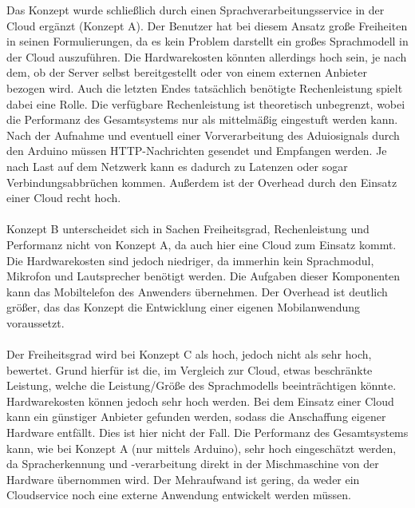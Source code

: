 Das Konzept wurde schließlich durch einen Sprachverarbeitungsservice in der Cloud ergänzt (Konzept A).
Der Benutzer hat bei diesem Ansatz große Freiheiten in seinen Formulierungen, da es kein Problem darstellt ein großes Sprachmodell in der Cloud auszuführen.
Die Hardwarekosten könnten allerdings hoch sein, je nach dem, ob der Server selbst bereitgestellt oder von einem externen Anbieter bezogen wird.
Auch die letzten Endes tatsächlich benötigte Rechenleistung spielt dabei eine Rolle.
Die verfügbare Rechenleistung ist theoretisch unbegrenzt, wobei die Performanz des Gesamtsystems nur als mittelmäßig eingestuft werden kann.
Nach der Aufnahme und eventuell einer Vorverarbeitung des Aduiosignals durch den Arduino müssen \ac{HTTP}-Nachrichten gesendet und Empfangen werden.
Je nach Last auf dem Netzwerk kann es dadurch zu Latenzen oder sogar Verbindungsabbrüchen kommen.
Außerdem ist der Overhead durch den Einsatz einer Cloud recht hoch.\\\\
Konzept B unterscheidet sich in Sachen Freiheitsgrad, Rechenleistung und Performanz nicht von Konzept A, da auch hier eine Cloud zum Einsatz kommt.
Die Hardwarekosten sind jedoch niedriger, da immerhin kein Sprachmodul, Mikrofon und Lautsprecher benötigt werden.
Die Aufgaben dieser Komponenten kann das Mobiltelefon des Anwenders übernehmen.
Der Overhead ist deutlich größer, das das Konzept die Entwicklung einer eigenen Mobilanwendung voraussetzt.\\\\
Der Freiheitsgrad wird bei Konzept C als hoch, jedoch nicht als sehr hoch, bewertet.
Grund hierfür ist die, im Vergleich zur Cloud, etwas beschränkte Leistung, welche die Leistung/Größe des Sprachmodells beeinträchtigen könnte.
Hardwarekosten können jedoch sehr hoch werden.
Bei dem Einsatz einer Cloud kann ein günstiger Anbieter gefunden werden, sodass die Anschaffung eigener Hardware entfällt.
Dies ist hier nicht der Fall. 
Die Performanz des Gesamtsystems kann, wie bei Konzept A (nur mittels Arduino), sehr hoch eingeschätzt werden, da Spracherkennung und -verarbeitung direkt in der Mischmaschine von der Hardware übernommen wird.
Der Mehraufwand ist gering, da weder ein Cloudservice noch eine externe Anwendung entwickelt werden müssen.
\endinput



